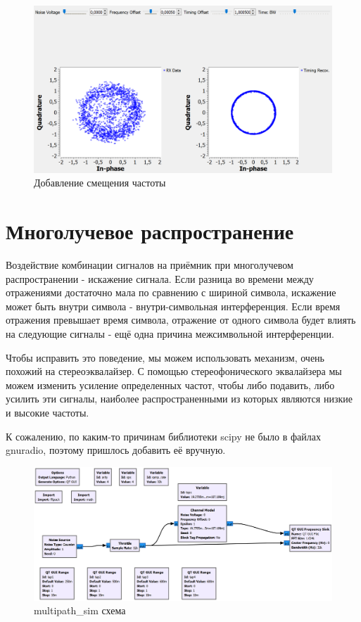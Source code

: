 \documentclass[a4paper,12pt]{report}
\begin{document}
\begin{figure}[H]
        \centering
        \includegraphics[width=1.0\textwidth]{lab12_fig3_13.png}
        \caption{Добавление смещения частоты}
        \label{fig:lab12_fig3_13}
\end{figure}

\chapter{Многолучевое распространение}

Воздействие комбинации сигналов на приёмник при многолучевом распространении - искажение сигнала. Если разница во времени между отражениями достаточно мала по сравнению с шириной символа, искажение может быть внутри символа - внутри-символьная интерференция. Если время отражения превышает время символа, отражение от одного символа будет влиять на следующие сигналы - ещё одна причина межсимвольной интерференции.

Чтобы исправить это поведение, мы можем использовать механизм, очень похожий на стереоэквалайзер. С помощью стереофонического эквалайзера мы можем изменить усиление определенных частот, чтобы либо подавить, либо усилить эти сигналы, наиболее распространенными из которых являются низкие и высокие частоты.

К сожалению, по каким-то причинам библиотеки scipy не было в файлах gnuradio, поэтому пришлось добавить её вручную.

\begin{figure}[H]
        \centering
        \includegraphics[width=1.0\textwidth]{lab12_fig4_1.png}
        \caption{multipath\_sim схема}
        \label{fig:lab12_fig4_1}
\end{figure}
\end{document}
